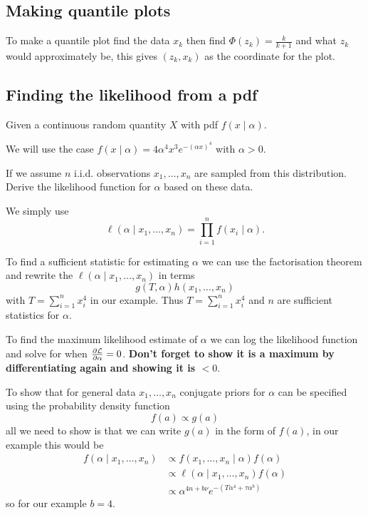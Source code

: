 \documentclass[10pt, a4paper]{article}
\begin{document}
\subsection{Making quantile plots}

To make a quantile plot find the data $x_k$ then find $\Phi(z_k) = \frac{k}{k + 1}$ and what $z_k$ would approximately be,
this gives $(z_k, x_k)$ as the coordinate for the plot.


\subsection{Finding the likelihood from a pdf}
Given a continuous random quantity $X$ with pdf $f(x\mid \alpha)$.

We will use the case $f(x\mid \alpha) = 4\alpha ^ 4x ^ 3e ^ {-(\alpha x) ^ 4}$ with $\alpha > 0$.

If we assume $n$ i.i.d. observations $x_1, \dotsc, x_n$ are sampled from this distribution.
Derive the likelihood function for $\alpha$ based on these data.

We simply use
\[
\ell(\alpha\mid x_1, \dotsc, x_n) = \prod_{i = 1}^{n}f(x_i\mid \alpha).
\]

To find a sufficient statistic for estimating $\alpha$ we can use the factorisation theorem and rewrite the $\ell(\alpha\mid x_1, \dotsc, x_n)$ in terms
\[
g(T, \alpha)h(x_1, \dotsc, x_n)
\]
with $T = \sum_{i = 1}^{n}x_i ^ 4$ in our example.
Thus $T = \sum_{i = 1}^{n}x_i ^ 4$ and $n$ are sufficient statistics for $\alpha$.

To find the maximum likelihood estimate of $\alpha$ we can log the likelihood function and solve for when $\pd[\mathcal{L}]{\alpha} = 0$.
\textbf{Don't forget to show it is a maximum by differentiating again and showing it is $< 0$}.

To show that for general data $x_1, \dotsc, x_n$ conjugate priors for $\alpha$ can be specified using the probability density function
\[
f(a) \propto g(a)
\]
all we need to show is that we can write $g(a)$ in the form of $f(a)$,
in our example this would be
\begin{align*}
    f(\alpha\mid x_1, \dotsc, x_n) &\propto f(x_1, \dotsc, x_n\mid \alpha)f(\alpha) \\
    &\propto \ell(\alpha\mid x_1, \dotsc, x_n)f(\alpha) \\
    &\propto \alpha ^ {4n + b\nu}e ^ {-(T\alpha ^ 4 + \tau\alpha ^ b)}
\end{align*}
so for our example $b = 4$.
\end{document}
